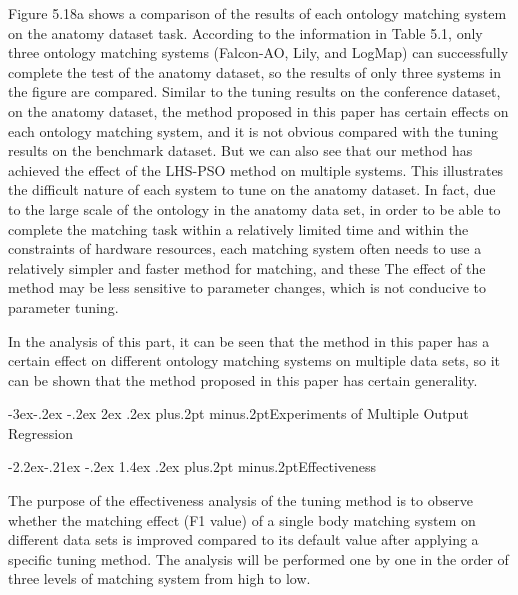 \documentclass[twoside]{article}
\makeatletter
\def\subsection{\@startsection{subsection}{2}{\z@}%
 {-3ex\@plus -.2ex \@minus -.2ex}%
 {2ex \@plus.2ex}%
{\normalfont\normalsize\protect\baselineskip=12.5pt plus.2pt minus.2pt\bfseries}}
\def\subsubsection{\@startsection{subsubsection}{3}{\z@}%
 {-2.2ex\@plus -.21ex \@minus -.2ex}%
 {1.4ex \@plus.2ex}
{\normalfont\normalsize\protect\baselineskip=12pt plus.2pt minus.2pt\sl}}
\makeatother
\begin{document}
\begin{multicols}{2}
Figure 5.18a shows a comparison of the results of each ontology matching system on the anatomy dataset task. 
According to the information in Table 5.1, only three ontology matching systems (Falcon-AO, Lily, and LogMap) can successfully complete the test of the anatomy dataset, so the results of only three systems in the figure are compared. 
Similar to the tuning results on the conference dataset, on the anatomy dataset, the method proposed in this paper has certain effects on each ontology matching system, and it is not obvious compared with the tuning results on the benchmark dataset. 
But we can also see that our method has achieved the effect of the LHS-PSO method on multiple systems. 
This illustrates the difficult nature of each system to tune on the anatomy dataset. 
In fact, due to the large scale of the ontology in the anatomy data set, in order to be able to complete the matching task within a relatively limited time and within the constraints of hardware resources, each matching system often needs to use a relatively simpler and faster method for matching, and these The effect of the method may be less sensitive to parameter changes, which is not conducive to parameter tuning.

In the analysis of this part, it can be seen that the method in this paper has a certain effect on different ontology matching systems on multiple data sets, so it can be shown that the method proposed in this paper has certain generality.

\subsection{Experiments of Multiple Output Regression}

\subsubsection{Effectiveness}

The purpose of the effectiveness analysis of the tuning method is to observe whether the matching effect (F1 value) of a single body matching system on different data sets is improved compared to its default value after applying a specific tuning method. 
The analysis will be performed one by one in the order of three levels of matching system from high to low.


\end{multicols}
\end{document}
